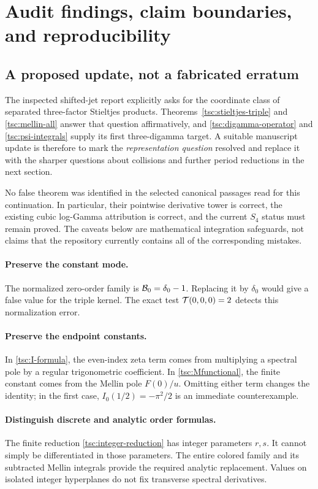 \section{Audit findings, claim boundaries, and reproducibility}\label{tsc:audit}
\subsection{A proposed update, not a fabricated erratum}
The inspected shifted-jet report explicitly asks for the coordinate class
of separated three-factor Stieltjes products. Theorems~\ref{tsc:stieltjes-triple}
and \ref{tsc:mellin-all} answer that question affirmatively, and
\eqref{tsc:digamma-operator} and \eqref{tsc:psi-integrals} supply its first
three-digamma target. A suitable manuscript update is therefore to mark the
\emph{representation question} resolved and replace it with the sharper
questions about collisions and further period reductions in the next
section.

No false theorem was identified in the selected canonical passages read
for this continuation. In particular, their pointwise derivative tower is
correct, the existing cubic log-Gamma attribution is correct, and the
current $S_4$ status must remain proved. The caveats below are mathematical
integration safeguards, not claims that the repository currently contains
all of the corresponding mistakes.

\paragraph{Preserve the constant mode.}
The normalized zero-order family is $\mathcal B_0=\delta_0-1$. Replacing it by
$\delta_0$ would give a false value for the triple kernel. The exact test
$\mathcal T(0,0,0)=2$ detects this normalization error.

\paragraph{Preserve the endpoint constants.}
In \eqref{tsc:I-formula}, the even-index zeta term comes from multiplying a
spectral pole by a regular trigonometric coefficient. In
\eqref{tsc:Mfunctional}, the finite constant comes from the Mellin pole
$F(0)/u$. Omitting either term changes the identity; in the first case,
$I_0(1/2)=-\pi^2/2$ is an immediate counterexample.

\paragraph{Distinguish discrete and analytic order formulas.}
The finite reduction \eqref{tsc:integer-reduction} has integer parameters
$r,s$. It cannot simply be differentiated in those parameters. The entire
colored family and its subtracted Mellin integrals provide the required
analytic replacement. Values on isolated integer hyperplanes do not fix
transverse spectral derivatives.

